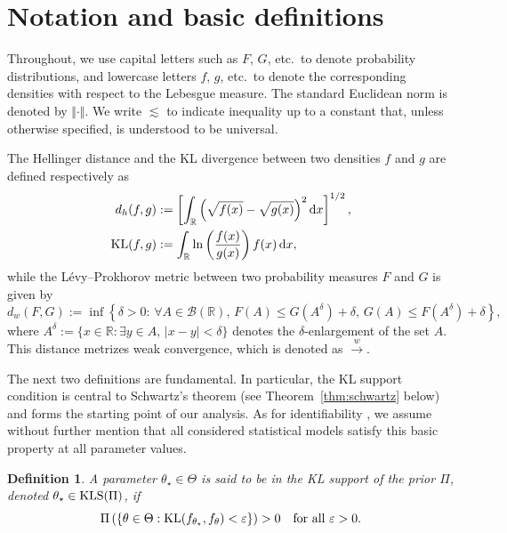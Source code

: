 \documentclass[11pt,twoside]{article}
\newcommand{\wc}{\overset{w}{\longrightarrow}}
\newcommand{\kl}{\textnormal{KL}}
\newtheorem{definition}{Definition}
\def\RR{\mathbb{R}}
\begin{document}
\section{Notation and basic definitions}\label{sec:notation}

Throughout, we use capital letters such as \(F\), \(G\), etc.\ to denote probability distributions, and lowercase letters \(f\), \(g\), etc.\ to denote the corresponding densities with respect to the Lebesgue measure. The standard Euclidean norm is denoted by \(\Vert \cdot \Vert\). We write \(\lesssim\) to indicate inequality up to a constant that, unless otherwise specified, is understood to be universal.

The Hellinger distance and the KL
divergence between two densities \(f\) and \(g\) are defined respectively as
%
\begin{align*}
    d_h(f, g) & := \left[\int_\RR \left(\sqrt{f(x)} - \sqrt{g(x)}\right)^2 \mathrm{d}x\right]^{1/2}, \\
    \kl(f,g) & := \int_\RR \ln\left(\frac{f(x)}{g(x)}\right) f(x)\,\mathrm dx,
\end{align*}
%
while the L\'evy–Prokhorov metric between two probability measures \(F\) and \(G\) is given by
%
\begin{equation*}
    d_w(F, G) := \inf\left\{\delta > 0:\, \forall A \in \mathscr B(\RR),\, F(A) \leq G(A^\delta) + \delta, \, G(A) \leq F(A^\delta) + \delta\right\},
\end{equation*}
%
where \(A^\delta := \{x \in \RR : \exists y \in A,\, \vert x - y \vert < \delta\}\) denotes the \(\delta\)-enlargement of the set \(A\). This distance metrizes weak convergence, which is denoted as $\wc$.

The next two definitions are fundamental. In particular, the KL support condition is central to Schwartz’s theorem (see Theorem~\ref{thm:schwartz} below) and forms the starting point of our analysis. As for identifiability \citep{casella2024statistical}, we assume without further mention that all considered statistical models satisfy this basic property at all parameter values.

\begin{definition}\label{def:KL_support}
    A parameter \(\theta_\star \in \Theta\) is said to be in the KL support of the prior \(\Pi\), denoted \(\theta_\star \in \textnormal{KLS}(\Pi)\), if
    \[
    \Pi\left(\left\{\theta \in \Theta : \kl(f_{\theta_\star}, f_\theta) < \varepsilon\right\}\right) > 0 \quad \text{for all } \varepsilon > 0.
    \]
\end{definition}
\end{document}
